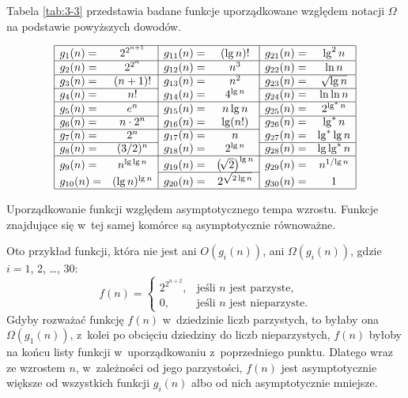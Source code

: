 Tabela \ref{tab:3-3} przedstawia badane funkcje uporządkowane względem notacji $\Omega$ na podstawie powyższych dowodów.
\begin{table}[ht]
	\begin{center}
		\[
			\begin{array}{|lc|lc|lc|} \hline
				g_1(n)= & 2^{2^{n+1}} & g_{11}(n)= & (\lg n)! & g_{21}(n)= & \lg^2n \\ \hline
				g_2(n)= & 2^{2^n} & g_{12}(n)= & n^3 & g_{22}(n)= & \ln n \\ \hline
				g_3(n)= & (n+1)! & g_{13}(n)= & n^2 & g_{23}(n)= & \sqrt{\lg n} \\ \cline{1-2}\cline{5-6}
				g_4(n)= & n! & g_{14}(n)= & 4^{\lg n} & g_{24}(n)= & \ln\ln n \\ \hline
				g_5(n)= & e^n & g_{15}(n)= & n\lg n & g_{25}(n)= & 2^{\lg^*n} \\ \cline{1-2}\cline{5-6}
				g_6(n)= & n\cdot2^n & g_{16}(n)= & \lg(n!) & g_{26}(n)= & \lg^*n \\ \cline{1-4}
				g_7(n)= & 2^n & g_{17}(n)= & n & g_{27}(n)= & \lg^*\lg n \\ \cline{1-2}\cline{5-6}
				g_8(n)= & (3/2)^n & g_{18}(n)= & 2^{\lg n} & g_{28}(n)= & \lg\lg^*n \\ \hline
				g_9(n)= & n^{\lg\lg n} & g_{19}(n)= & \bigl(\!\sqrt{2}\bigr)^{\lg n} & g_{29}(n)= & n^{1/\!\lg n} \\ \cline{3-4}
				g_{10}(n)= & (\lg n)^{\lg n} & g_{20}(n)= & 2^{\sqrt{2\lg n}} & g_{30}(n)= & 1 \\ \hline
			\end{array}
		\]
	\end{center}
	\caption{Uporządkowanie funkcji względem asymptotycznego tempa wzrostu.
Funkcje znajdujące się w~tej samej komórce są asymptotycznie równoważne.} \label{tab:3-3}
\end{table}

\subproblem %
Oto przykład funkcji, która nie jest ani $O(g_i(n))$, ani $\Omega(g_i(n))$, gdzie $i=1$, 2, \dots, 30:
\[
	f(n) =
	\begin{cases}
		2^{2^{n+2}}, & \text{jeśli $n$ jest parzyste}, \\
		0, & \text{jeśli $n$ jest nieparzyste}.
	\end{cases}
\]
Gdyby rozważać funkcję $f(n)$ w~dziedzinie liczb parzystych, to byłaby ona $\Omega(g_1(n))$, z~kolei po obcięciu dziedziny do liczb nieparzystych, $f(n)$ byłoby na końcu listy funkcji w~uporządkowaniu z~poprzedniego punktu.
Dlatego wraz ze wzrostem $n$, w~zależności od jego parzystości, $f(n)$ jest asymptotycznie większe od wszystkich funkcji $g_i(n)$ albo od nich asymptotycznie mniejsze.

